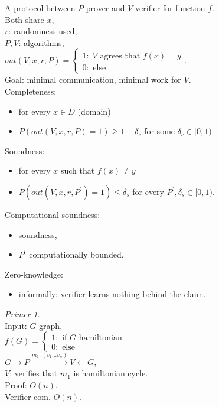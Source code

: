 \documentclass[a4paper, 12pt]{book}
\theoremstyle{definition}
\theoremstyle{remark}
\newtheorem*{ex}{Primer}
\begin{document}
A protocol between $P$ prover and $V$ verifier for function $f$. \\
Both share $x$, \\
$r$: randomness used, \\
$P, V$: algorithms, \\
$out(V, x, r, P) = \begin{cases}
  1: \; V \text{ agrees that } f(x) = y \\
  0: \text{ else}
\end{cases}$. \\
Goal: minimal communication, minimal work for $V$. \\
Completeness:
\begin{itemize}
  \item for every $x \in D$ (domain)
  \item $P(out(V, x, r, P) = 1) \geq 1 - \delta_c$ for some $\delta_c \in [0, 1)$.
\end{itemize}
Soundness:
\begin{itemize}
  \item for every $x$ such that $f(x) \neq y$
  \item $P(out(V, x, r, P^{'}) = 1) \leq \delta_s$ for every $P^{'}, \delta_s \in [0, 1)$.
\end{itemize}
Computational soundness:
\begin{itemize}
  \item soundness,
  \item $P^{'}$ computationally bounded.
\end{itemize}
Zero-knowledge:
\begin{itemize}
  \item informally: verifier learns nothing behind the claim.
\end{itemize}
\begin{ex} \text{} \\
  Input: $G$ graph, \\
  $f(G) = \begin{cases}
    1: \text{ if $G$ hamiltonian} \\
    0: \text{ else}
  \end{cases}$ \\
  $G \to P \stackrel{m_1: (v_1 \dots v_n)}{\longrightarrow} V \leftarrow G$, \\
  $V$: verifies that $m_1$ is hamiltonian cycle. \\
  Proof: $O(n)$. \\
  Verifier com. $O(n)$.
\end{ex}
\end{document}
